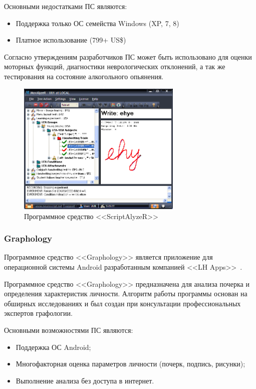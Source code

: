 Основными недостатками ПС являются:
\begin{itemize}
  \item Поддержка только ОС семейства Windows (XP, 7, 8)
  \item Платное использование (799+ US\$)
\end{itemize}

Согласно утверждениям разработчиков ПС может быть использовано для оценки моторных функций, диагностики неврологических отклонений, а так же тестирования на состояние алкогольного опьянения.

\begin{figure}[ht]
    \centering
    \label{fig:domain:analogs:neuro_script}
    \includegraphics[width=0.7\textwidth]{figures/neuroscript.png}
    \caption{Программное средство <<ScriptAlyzeR>>}
\end{figure}

\subsubsection{Graphology}
\label{sub:domain:analogs:graphology} 

Программное средство <<Graphology>> является приложение для операционной системы Android разработанным компанией <<LH Apps>>~\cite{analogs_graphology}.

Программное средство <<Graphology>> предназначена для анализа почерка и определения характеристик личности. Алгоритм работы программы основан на обширных исследованиях и был создан при консультации профессиональных экспертов графологии.

Основными возможностями ПС являются:
\begin{itemize}

  \item Поддержка ОС Android;
  \item Многофакторная оценка параметров личности (почерк, подпись, рисунки);
  \item Выполнение анализа без доступа в интернет.
\end{itemize}

